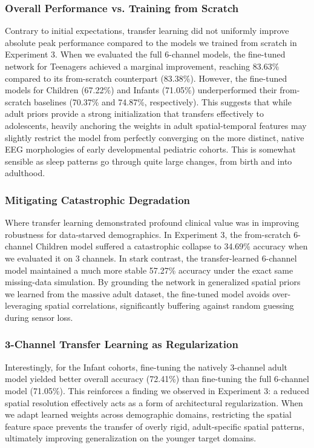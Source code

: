 \subsubsection*{Overall Performance vs. Training from Scratch}
Contrary to initial expectations, transfer learning did not uniformly improve absolute peak performance compared to the models 
we trained from scratch in Experiment 3. When we evaluated the full 6-channel models, the fine-tuned network for Teenagers achieved a 
marginal improvement, reaching 83.63\% compared to its from-scratch counterpart (83.38\%). However, the fine-tuned models for Children
(67.22\%) and Infants (71.05\%) underperformed their from-scratch baselines (70.37\% and 74.87\%, respectively). This suggests that
while adult priors provide a strong initialization that transfers effectively to adolescents, heavily anchoring the weights in adult
spatial-temporal features may slightly restrict the model from perfectly converging on the more distinct, native EEG morphologies of
early developmental pediatric cohorts. This is somewhat sensible as sleep patterns go through quite large changes, from birth and into adulthood.

\subsubsection*{Mitigating Catastrophic Degradation}
Where transfer learning demonstrated profound clinical value was in improving robustness for data-starved demographics. In Experiment 3, the from-scratch 6-channel Children model suffered a catastrophic collapse to 34.69\% accuracy when we evaluated it on 3 channels. In stark contrast, the transfer-learned 6-channel model maintained a much more stable 57.27\% accuracy under the exact same missing-data simulation. By grounding the network in generalized spatial priors we learned from the massive adult dataset, the fine-tuned model avoids over-leveraging spatial correlations, significantly buffering against random guessing during sensor loss.

\subsubsection*{3-Channel Transfer Learning as Regularization}
Interestingly, for the Infant cohorts, fine-tuning the natively 3-channel adult model yielded better overall accuracy (72.41\%) than fine-tuning the full 6-channel model (71.05\%). This reinforces a finding we observed in Experiment 3: a reduced spatial resolution effectively acts as a form of architectural regularization. When we adapt learned weights across demographic domains, restricting the spatial feature space prevents the transfer of overly rigid, adult-specific spatial patterns, ultimately improving generalization on the younger target domains.

